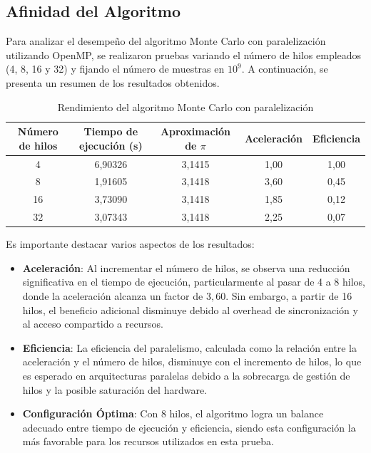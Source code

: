 \documentclass[a4paper, 10pt, onecolumn]{IEEEtran}
\begin{document}
\subsection{Afinidad del Algoritmo}

Para analizar el desempeño del algoritmo Monte Carlo con paralelización utilizando OpenMP, se realizaron pruebas variando el número de hilos empleados (4, 8, 16 y 32) y fijando el número de muestras en $10^9$. A continuación, se presenta un resumen de los resultados obtenidos.

\begin{table}[H]
  \centering
  \begin{tabular}{|c|c|c|c|c|}
    \hline
    \textbf{Número de hilos} & \textbf{Tiempo de ejecución (s)} & \textbf{Aproximación de $\pi$} & \textbf{Aceleración} & \textbf{Eficiencia} \\
    \hline
    4  & 6,90326  & 3,1415 & 1,00  & 1,00 \\
    8  & 1,91605  & 3,1418 & 3,60  & 0,45 \\
    16 & 3,73090  & 3,1418 & 1,85  & 0,12 \\
    32 & 3,07343  & 3,1418 & 2,25  & 0,07 \\
    \hline
  \end{tabular}
  \caption{Rendimiento del algoritmo Monte Carlo con paralelización}
  \label{tab:parallel_affinity}
\end{table}

Es importante destacar varios aspectos de los resultados:

\begin{itemize}
  \item \textbf{Aceleración}: Al incrementar el número de hilos, se observa una reducción significativa en el tiempo de ejecución, particularmente al pasar de 4 a 8 hilos, donde la aceleración alcanza un factor de $3,60$. Sin embargo, a partir de 16 hilos, el beneficio adicional disminuye debido al overhead de sincronización y al acceso compartido a recursos.
  
  \item \textbf{Eficiencia}: La eficiencia del paralelismo, calculada como la relación entre la aceleración y el número de hilos, disminuye con el incremento de hilos, lo que es esperado en arquitecturas paralelas debido a la sobrecarga de gestión de hilos y la posible saturación del hardware.
  
  \item \textbf{Configuración Óptima}: Con 8 hilos, el algoritmo logra un balance adecuado entre tiempo de ejecución y eficiencia, siendo esta configuración la más favorable para los recursos utilizados en esta prueba.
\end{itemize}
\end{document}

